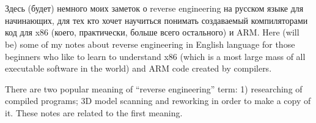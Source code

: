 ﻿\chapter{}

\IFRU
{Здесь (будет) немного моих заметок о reverse engineering на русском языке для начинающих, 
для тех кто хочет научиться понимать создаваемый \CCpp компиляторами код для x86 (коего, 
практически, больше всего остального) и ARM.}
{Here (will be) some of my notes about reverse engineering in English language for 
those beginners who like to learn to understand x86 (which is a most large mass of 
all executable software in the world) and ARM code created by \CCpp compilers.}

{There are two popular meaning of ``reverse engineering'' term: 1) researching of compiled programs;
3D model scanning and reworking in order to make a copy of it.
These notes are related to the first meaning.}


